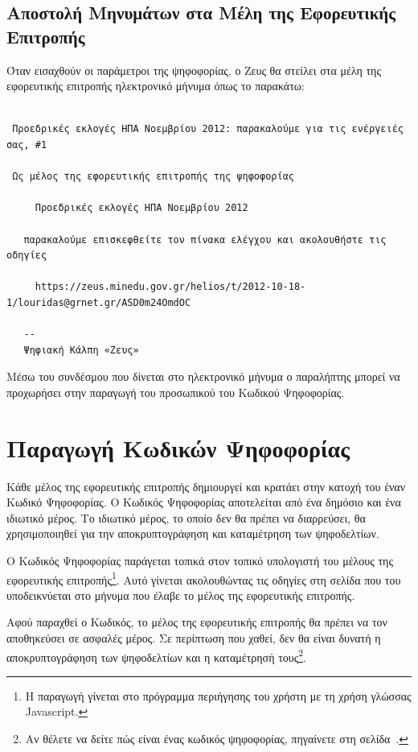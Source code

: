 \documentclass{tufte-handout}
\begin{document}
\subsection{Αποστολή Μηνυμάτων στα Μέλη της Εφορευτικής Επιτροπής}

Όταν εισαχθούν οι παράμετροι της ψηφοφορίας, ο Ζευς θα στείλει στα
μέλη της εφορευτικής επιτροπής ηλεκτρονικό μήνυμα όπως το
παρακάτω:
\begin{verbatim}

 Προεδρικές εκλογές ΗΠΑ Νοεμβρίου 2012: παρακαλούμε για τις ενέργειές σας, #1

 Ως μέλος της εφορευτικής επιτροπής της ψηφοφορίας

     Προεδρικές εκλογές ΗΠΑ Νοεμβρίου 2012

   παρακαλούμε επισκεφθείτε τον πίνακα ελέγχου και ακολουθήστε τις οδηγίες

     https://zeus.minedu.gov.gr/helios/t/2012-10-18-1/louridas@grnet.gr/ASD0m24OmdOC

   --
   Ψηφιακή Κάλπη «Ζευς»
\end{verbatim}

\noindent Μέσω του συνδέσμου που δίνεται στο ηλεκτρονικό μήνυμα ο
παραλήπτης μπορεί να προχωρήσει στην παραγωγή του προσωπικού του
Κωδικού Ψηφοφορίας.

\section{Παραγωγή Κωδικών Ψηφοφορίας}

Κάθε μέλος της εφορευτικής επιτροπής δημιουργεί και κρατάει στην
κατοχή του έναν Κωδικό Ψηφοφορίας. Ο Κωδικός Ψηφοφορίας αποτελείται
από ένα δημόσιο και ένα ιδιωτικό μέρος. Το ιδιωτικό μέρος, το οποίο
δεν θα πρέπει να διαρρεύσει, θα χρησιμοποιηθεί για την
αποκρυπτογράφηση και καταμέτρηση των ψηφοδελτίων. 

Ο Κωδικός Ψηφοφορίας παράγεται τοπικά στον τοπικό υπολογιστή του
μέλους της εφορευτικής επιτροπής\footnote{Η παραγωγή γίνεται στο
  πρόγραμμα περιήγησης του χρήστη με τη χρήση γλώσσας Javascript.}.
Αυτό γίνεται ακολουθώντας τις οδηγίες στη σελίδα που του υποδεικνύεται
στο μήνυμα που έλαβε το μέλος της εφορευτικής επιτροπής.

Αφού παραχθεί ο Κωδικός, το μέλος της εφορευτικής επιτροπής θα πρέπει
να τον αποθηκεύσει σε ασφαλές μέρος. Σε περίπτωση που χαθεί, δεν θα
είναι δυνατή η αποκρυπτογράφηση των ψηφοδελτίων και η καταμέτρησή
τους\footnote{Αν θέλετε να δείτε πώς είναι ένας κωδικός ψηφοφορίας,
  πηγαίνετε στη σελίδα~\pageref{sec:electoral-committee-key}.}.
\end{document}
